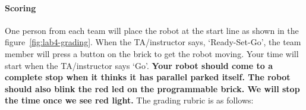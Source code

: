 \documentclass[11pt]{article}
\begin{document}
\paragraph{Scoring} 
One person from each team will place the robot at the start line as shown in the figure~\ref{fig:lab4-grading}. When the TA/instructor says, `Ready-Set-Go', the team member will press a button on the brick to get the robot moving. Your time will start when the TA/instructor says `Go'. {\bf Your robot should come to a complete stop when it thinks it has parallel parked itself. The robot  should also blink the red led on the programmable brick. We will stop the time once we see red light.}
The grading rubric is as follows:
\end{document}
